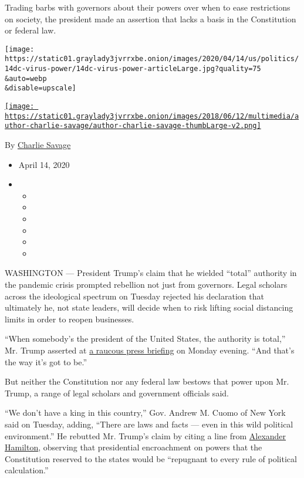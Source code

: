 Trading barbs with governors about their powers over when to ease
restrictions on society, the president made an assertion that lacks a
basis in the Constitution or federal law.

\texttt{[image: https://static01.graylady3jvrrxbe.onion/images/2020/04/14/us/politics/14dc-virus-power/14dc-virus-power-articleLarge.jpg?quality=75\\\&auto=webp\\\&disable=upscale]}

\href{https://www.nytimes3xbfgragh.onion/by/charlie-savage}{\texttt{[image: https://static01.graylady3jvrrxbe.onion/images/2018/06/12/multimedia/author-charlie-savage/author-charlie-savage-thumbLarge-v2.png]}}

By \href{https://www.nytimes3xbfgragh.onion/by/charlie-savage}{Charlie
Savage}

\begin{itemize}
\item
  April 14, 2020
\item
  \begin{itemize}
  \item
  \item
  \item
  \item
  \item
  \item
  \end{itemize}
\end{itemize}

WASHINGTON --- President Trump's claim that he wielded ``total''
authority in the pandemic crisis prompted rebellion not just from
governors. Legal scholars across the ideological spectrum on Tuesday
rejected his declaration that ultimately he, not state leaders, will
decide when to risk lifting social distancing limits in order to reopen
businesses.

``When somebody's the president of the United States, the authority is
total,'' Mr. Trump asserted at
\href{https://www.nytimes3xbfgragh.onion/2020/04/13/us/politics/trump-coronavirus-governors.html}{a
raucous press briefing} on Monday evening. ``And that's the way it's got
to be.''

But neither the Constitution nor any federal law bestows that power upon
Mr. Trump, a range of legal scholars and government officials said.

``We don't have a king in this country,'' Gov. Andrew M. Cuomo of New
York said on Tuesday, adding, ``There are laws and facts --- even in
this wild political environment.'' He rebutted Mr. Trump's claim by
citing a line from
\href{https://teachingamericanhistory.org/library/document/speech-on-the-compromises-of-the-constitution/}{Alexander
Hamilton}, observing that presidential encroachment on powers that the
Constitution reserved to the states would be ``repugnant to every rule
of political calculation.''

